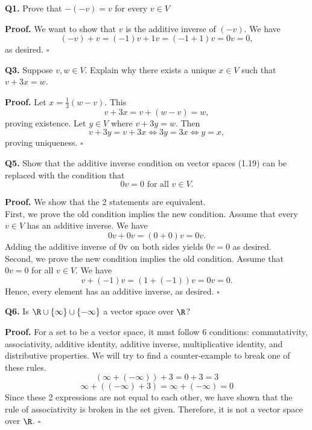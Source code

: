 \documentclass[12 pt]{article} %
\begin{document}
\textbf{Q1.}							%
Prove that $-(-v)=v$ for every $v\in V$																				%

\textbf{Proof.}              						%
We want to show that $v$ is the additive inverse of $(-v)$. We have 
$$(-v)+v=(-1)v+1v=(-1+1)v=0v=0,$$
as desired. $\square$

\textbf{Q3.}
Suppose $v,w\in V$. Explain why there exists a unique $x\in V$ such that $v+3x=w$.

\textbf{Proof.}
Let $x=\frac{1}{3}(w-v)$. This
$$v+3x=v+(w-v)=w,$$
proving existence.
Let $y\in V$ where $v+3y=w$. Then
$$v+3y=v+3x\iff 3y=3x\iff y=x,$$
proving uniqueness. $\square$

\textbf{Q5.}
Show that the additive inverse condition on vector spaces (1.19) 
can be replaced with the condition that
$$0v=0 \text{ for all } v\in V.$$

\textbf{Proof.}
We show that the 2 statements are equivalent.\\
First, we prove the old condition implies the new condition.
Assume that every $v\in V$ has an additive inverse.
We have
$$0v+0v=(0+0)v=0v.$$
Adding the additive inverse of 0v on both sides yields
$0v=0$ as desired.\\
Second, we prove the new condition implies the old condition.
Assume that $0v=0$ for all $v\in V$.
We have
$$v+(-1)v=(1+(-1))v=0v=0.$$
Hence, every element has an additive inverse, as desired. $\square$

\textbf{Q6.}
Is $\R\cup\{\infty\}\cup\{-\infty\}$ a vector space over $\R$?

\textbf{Proof.}
For a set to be a vector space, it must follow 6 conditions:
commutativity, associativity, additive identity, additive inverse, multiplicative identity, and distributive properties.
We will try to find a counter-example to break one of these rules.
$$(\infty+(-\infty))+3=0+3=3$$
$$\infty+((-\infty)+3)=\infty+(-\infty)=0$$
Since these 2 expressions are not equal to each other, we have shown that the rule of associativity
is broken in the set given. Therefore, it is not a vector space over $\R$. $\square$
\end{document}
